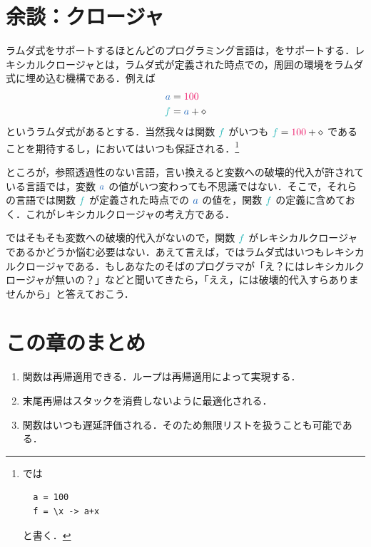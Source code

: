 \documentclass[a5paper,twoside,fleqn,draft]{jsbook}
\begin{document}
%

\section{余談：クロージャ}

ラムダ式をサポートするほとんどのプログラミング言語は，をサポートする．レキシカルクロージャとは，ラムダ式が定義された時点での，周囲の環境をラムダ式に埋め込む機構である．例えば
\begin{align}
  \hVar{a}
  &=\hConstant{100}\\
  \hFunc{f}
  &=\hVar{a}+\hAnonParam
\end{align}
というラムダ式があるとする．当然我々は関数 $\hFunc{f}$ がいつも $\hFunc{f}=\hConstant{100}+\hAnonParam$ であることを期待するし，\haskell においてはいつも保証される．\footnote{\haskell では
\begin{verbatim}
  a = 100
  f = \x -> a+x
\end{verbatim}
と書く．}

ところが，参照透過性のない言語，言い換えると変数への破壊的代入が許されている言語では，変数 $\hVar{a}$ の値がいつ変わっても不思議ではない．そこで，それらの言語では関数 $\hFunc{f}$ が定義された時点での $\hVar{a}$ の値を，関数 $\hFunc{f}$ の定義に含めておく．これがレキシカルクロージャの考え方である．

\haskell ではそもそも変数への破壊的代入がないので，関数 $\hFunc{f}$ がレキシカルクロージャであるかどうか悩む必要はない．あえて言えば，\haskell ではラムダ式はいつもレキシカルクロージャである．もしあなたのそばの\cxx プログラマが「え？\haskell にはレキシカルクロージャが無いの？」などと聞いてきたら，「ええ，\haskell には破壊的代入すらありませんから」と答えておこう．

\section{この章のまとめ}

\begin{enumerate}
\item 関数は再帰適用できる．ループは再帰適用によって実現する．
\item 末尾再帰はスタックを消費しないように最適化される．
\item 関数はいつも遅延評価される．そのため無限リストを扱うことも可能である．
\end{enumerate}
\end{document}

